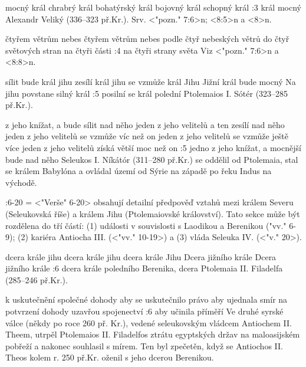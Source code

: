     {mocný král}   %
    {chrabrý král}   %
    {bohatýrský král}   %
    {bojovný král}   %
    {schopný král}   %
:3 {král mocný} Alexandr Veliký (336--323 př.Kr.). Srv. <"pozn." 7:6>n; <8:5>n a  <8>n.  

    {čtyřem větrům nebes}   %
    {čtyřem větrům nebes}   %
    {podle čtyř nebeských větrů}   %
    {do čtyř světových stran}   %
    {na čtyři části}   %
:4 {na čtyři strany světa}  Viz <"pozn." 7:6>n a <8:8>n. 

    {sílit bude král jihu}   %
    {zesílí král jihu}   %
    {se vzmůže král Jihu}   %
    {Jižní král bude mocný}   %
    {Na jihu povstane silný král}   %
:5 {posilní se král polední} Ptolemaios I. Sótér (323--285 př.Kr.).  
   
    {z jeho knížat, a bude sílit nad něho}   %
    {jeden z jeho velitelů a ten zesílí nad něho}   %
    {jeden z jeho velitelů se vzmůže víc než on}   %
    {jeden z jeho velitelů se vzmůže ještě více}   %
    {jeden z jeho velitelů získá větší moc než on}   %
:5 {jedno z jeho knížat, a mocnější bude nad něho} 
    Seleukos I. Níkátór (311--280 př.Kr.) se oddělil od Ptolemaia, stal se králem Babylóna a ovládal území od Sýrie na západě po řeku Indus na východě.
   
:6-20 {}={}  <"Verše" 6-20> obsahují detailní předpověď vztahů mezi  králem Severu (Seleukovská říše) a králem Jihu (Ptolemaiovské království). Tato sekce může být rozdělena do tří částí: (1) události v souvislosti s Laodikou a Berenikou ("vv." 6-9); (2) kariéra Antiocha III. (<"vv." 10-19>) a (3) vláda Seleuka IV. (<"v." 20>).


    {dcera krále jihu}   %
    {dcera krále jihu}   %
    {dcera krále Jihu}   %
    {Dcera jižního krále}   %
    {Dcera jižního krále}   %
:6 {dcera krále poledního}
    Berenika, dcera Ptolemaia II. Filadelfa (285--246 př.Kr.). 


    {k uskutečnění společné dohody}   %
    {aby se uskutečnilo právo}   %
    {aby ujednala smír}   %
    {na potvrzení dohody}   %
    {uzavřou spojenectví}   %
:6 {aby učinila příměří}
    Ve druhé syrské válce (někdy po roce 260 př. Kr.), vedené seleukovským vládcem Antiochem II. Theem, utrpěl Ptolemaios II. Filadelfos ztrátu egyptských držav na maloasijském pobřeží a nakonec souhlasil s mírem. Ten byl zpečetěn, když se Antiochos II. Theos kolem r. 250 př.Kr. oženil s jeho dcerou Berenikou.


